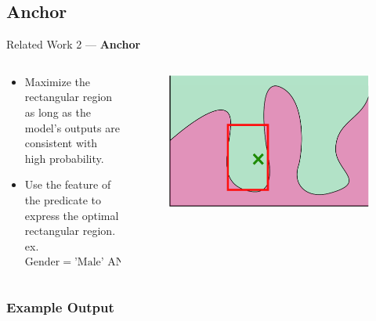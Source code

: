 \documentclass[aspectratio=169]{slide-en}
\begin{document}
\subsection{Anchor}

\begin{frame}{}
  Related Work 2 — \textbf{Anchor}
  \begin{columns}[]
    \begin{column}{0.5\textwidth}
      \begin{itemize}
        \item Maximize the rectangular region \\ as long as
              the model's outputs are consistent with high probability.
        \item Use the feature of the predicate to express the optimal
              rectangular region. \\
              \smallskip
              \footnotesize{
                ex. $\textrm{Gender} = \textrm{'Male' AND } 20\le\textrm{Age} < 30$
              }
      \end{itemize}

      \bigskip
    \end{column}
    \begin{column}{0.5\textwidth}
      \begin{figure}
        \includegraphics[scale=0.35]{img/visual-anchor}
      \end{figure}
    \end{column}
  \end{columns}
\end{frame}

\subsubsection{Example Output}
\end{document}
